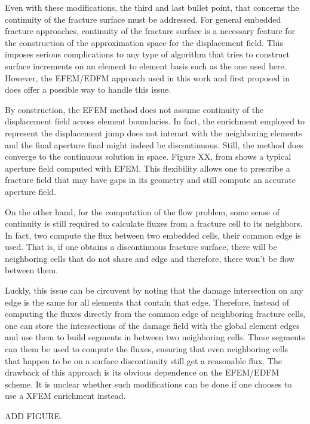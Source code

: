 Even with these modifications, the third and last bullet point, that concerns the continuity of the fracture surface must be addressed. For general embedded fracture approaches, continuity of the fracture surface is a necessary feature for the construction of the approximation space for the displacement field. This imposes serious complications to any type of algorithm that tries to construct surface increments on an element to element basis such as the one used here. However, the EFEM/EDFM approach used in this work and first proposed in \cite{cusini2021simulation} does offer a possible way to handle this issue.

By construction, the EFEM method does not assume continuity of the displacement field across element boundaries. In fact, the enrichment employed to represent the displacement jump does not interact with the neighboring elements and the final aperture final might indeed be discontinuous. Still, the method does converge to the continuous solution in space. Figure XX, from \cite{cusini2021simulation} shows a typical aperture field computed with EFEM. This flexibility allows one to prescribe a fracture field that may have gaps in its geometry and still compute an accurate aperture field. 

On the other hand, for the computation of the flow problem, some sense of continuity is still required to calculate fluxes from a fracture cell to its neighbors. In fact, two compute the flux between two embedded cells, their common edge is used. That is, if one obtains a discontinuous fracture surface, there will be neighboring cells that do not share and edge and therefore, there won't be flow between them. 

Luckly, this issue can be circuvent by noting that the damage intersection on any edge is the same for all elements that contain that edge. Therefore, instead of computing the fluxes directly from the common edge of neighboring fracture cells, one can store the intersections of the damage field with the global element edges and use them to build segments in between two neighboring cells. These segments can them be used to compute the fluxes, ensuring that even neighboring cells that happen to be on a surface discontinuity still get a reasonable flux. The drawback of this approach is its obvious dependence on the EFEM/EDFM scheme. It is unclear whether such modifications can be done if one chooses to use a XFEM enrichment instead.

ADD FIGURE.

